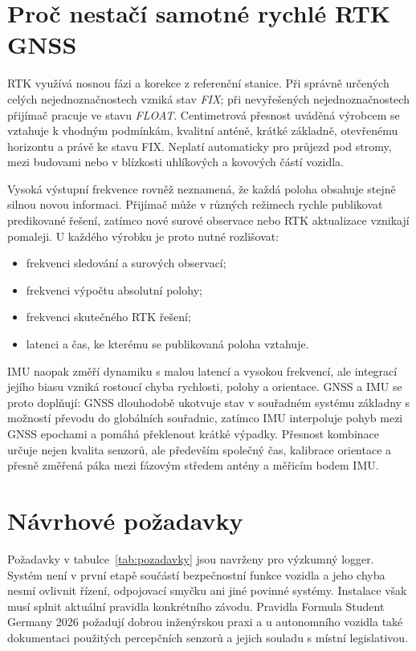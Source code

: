 \section{Proč nestačí samotné rychlé RTK GNSS}

RTK využívá nosnou fázi a korekce z referenční stanice. Při správně určených
celých nejednoznačnostech vzniká stav \emph{FIX}; při nevyřešených
nejednoznačnostech přijímač pracuje ve stavu \emph{FLOAT}. Centimetrová
přesnost uváděná výrobcem se vztahuje k vhodným podmínkám, kvalitní anténě,
krátké základně, otevřenému horizontu a právě ke stavu FIX. Neplatí automaticky
pro průjezd pod stromy, mezi budovami nebo v blízkosti uhlíkových a kovových
částí vozidla.

Vysoká výstupní frekvence rovněž neznamená, že každá poloha obsahuje stejně
silnou novou informaci. Přijímač může v různých režimech rychle publikovat
predikované řešení, zatímco nové surové observace nebo RTK aktualizace vznikají
pomaleji. U každého výrobku je proto nutné rozlišovat:

\begin{itemize}
  \item frekvenci sledování a surových observací;
  \item frekvenci výpočtu absolutní polohy;
  \item frekvenci skutečného RTK řešení;
  \item latenci a čas, ke kterému se publikovaná poloha vztahuje.
\end{itemize}

IMU naopak změří dynamiku s malou latencí a vysokou frekvencí, ale integrací
jejího biasu vzniká rostoucí chyba rychlosti, polohy a orientace. GNSS a IMU se
proto doplňují: GNSS dlouhodobě ukotvuje stav v souřadném systému základny
s možností převodu do globálních souřadnic,
zatímco IMU interpoluje pohyb mezi GNSS epochami a pomáhá překlenout krátké
výpadky. Přesnost kombinace určuje nejen kvalita senzorů, ale především společný
čas, kalibrace orientace a přesně změřená páka mezi fázovým středem antény a
měřicím bodem IMU.

\section{Návrhové požadavky}

Požadavky v tabulce~\ref{tab:pozadavky} jsou navrženy pro výzkumný logger.
Systém není v první etapě součástí bezpečnostní funkce vozidla a jeho chyba
nesmí ovlivnit řízení, odpojovací smyčku ani jiné povinné systémy. Instalace
však musí splnit aktuální pravidla konkrétního závodu. Pravidla Formula Student
Germany 2026 požadují dobrou inženýrskou praxi a u autonomního vozidla také
dokumentaci použitých percepčních senzorů a jejich souladu s místní
legislativou.
\cite{fsg-rules-2026}

